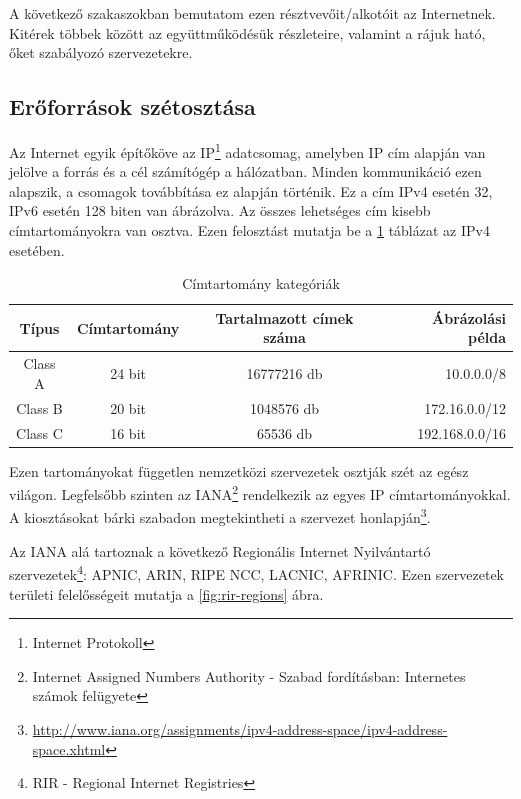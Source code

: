 A következő szakaszokban bemutatom ezen résztvevőit/alkotóit az Internetnek. Kitérek többek között az együttműködésük részleteire, valamint a rájuk ható, őket szabályozó szervezetekre.

\subsection{Erőforrások szétosztása}
Az Internet egyik építőköve az IP\footnote{Internet Protokoll} adatcsomag, amelyben IP cím alapján van jelölve a forrás és a cél számítógép a hálózatban. Minden kommunikáció ezen alapszik, a csomagok továbbítása ez alapján történik. Ez a cím IPv4 esetén 32, IPv6 esetén 128 biten van ábrázolva. Az összes lehetséges cím kisebb címtartományokra van osztva. Ezen felosztást mutatja be a \ref{tab:cimtartomanyok} táblázat az IPv4 esetében.

\begin{table}[ht]
	\centering
	\caption{Címtartomány kategóriák}
	\hspace{2mm}
	\begin{tabular}{ | c | c | c | r |}
	\hline
	Típus & Címtartomány & Tartalmazott címek száma & Ábrázolási példa \\ \hline

Class A & 24 bit & 16777216 db & 10.0.0.0/8\\ \hline
Class B & 20 bit & 1048576 db & 172.16.0.0/12\\ \hline
Class C & 16 bit & 65536 db & 192.168.0.0/16\\ \hline
	\end{tabular}
	\label{tab:cimtartomanyok}
\end{table}


Ezen tartományokat független nemzetközi szervezetek osztják szét az egész világon. Legfelsőbb szinten az IANA\footnote{Internet Assigned Numbers Authority - Szabad fordításban: Internetes számok felügyete} rendelkezik az egyes IP címtartományokkal. A kiosztásokat bárki szabadon megtekintheti a szervezet honlapján\footnote{\url{http://www.iana.org/assignments/ipv4-address-space/ipv4-address-space.xhtml}}.

Az IANA alá tartoznak a következő Regionális Internet Nyilvántartó szervezetek\footnote{RIR - Regional Internet Registries}: APNIC, ARIN, RIPE NCC, LACNIC, AFRINIC.
Ezen szervezetek területi felelősségeit mutatja a \ref{fig:rir-regions} ábra.

